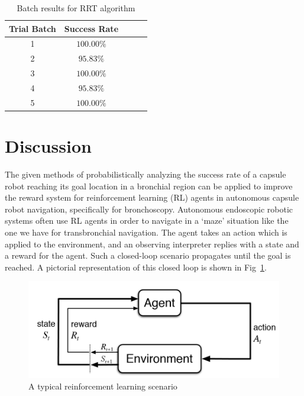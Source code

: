 \documentclass[conference]{IEEEtran}
\begin{document}
\begin{table}[h!]
    \begin{center}
        \begin{tabular}{||c|c|c|c|c||}
        \hline
        Trial Batch & Success Rate \\
        \hline\hline
        1 & $100.00\%$ \\
        2 & $95.83\%$  \\
        3 & $100.00\%$ \\
        4 & $95.83\%$ \\
        5 & $100.00\%$ \\
        \hline
        \end{tabular}
    \end{center}
    \caption{Batch results for RRT algorithm}
    \label{rrt-batch-table}
\end{table}

\section{Discussion}
The given methods of probabilistically analyzing the success rate of a capsule robot reaching
its goal location in a bronchial region can be applied to improve the reward system for 
reinforcement learning (RL) agents in autonomous capsule robot navigation, specifically for
bronchoscopy. Autonomous endoscopic robotic systems
often use RL agents\cite{Turan2019} in order to navigate in a `maze' situation like the one we have
for transbronchial navigation. The agent takes an action which is applied to the environment,
and an observing interpreter replies with a state and a reward for the agent. Such a closed-loop scenario 
propagates until the goal is reached. A pictorial representation of this closed loop is shown
in Fig~\ref{rl-loop-fig}.

\begin{figure}[h]
    \centering
    \includegraphics[scale=0.23]{rl-loop.png}
    \caption{A typical reinforcement learning scenario}
    \label{rl-loop-fig}
\end{figure}
\end{document}
